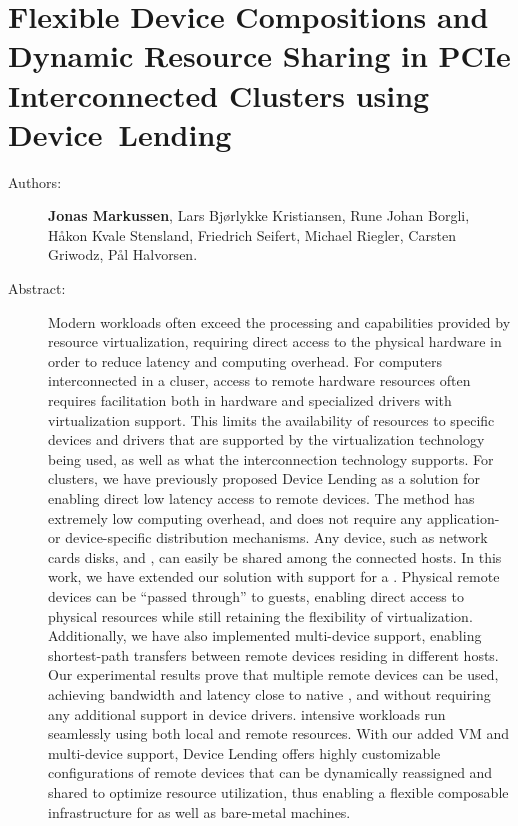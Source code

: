 \chapter{Flexible Device Compositions and Dynamic Resource Sharing in PCIe Interconnected Clusters using Device~Lending}
\label{paper:cc}
\paperthumb

\begin{description}
	\item[Authors:]
		\textbf{Jonas Markussen}, Lars Bj{\o}rlykke Kristiansen, Rune Johan Borgli, H{\aa}kon Kvale Stensland,
		Friedrich Seifert, Michael Riegler, Carsten Griwodz, P{\aa}l Halvorsen.

	\item[Abstract:]
		Modern workloads often exceed the processing and  capabilities provided by resource virtualization,
		requiring direct access to the physical hardware in order to reduce latency and computing overhead.
		For computers interconnected in a cluser, access to remote hardware resources often requires facilitation
		both in hardware and specialized drivers with virtualization support. This limits the availability of
		resources to specific devices and drivers that are supported by the virtualization technology being used, as
		well as what the interconnection technology supports.
		For  clusters, we have previously proposed Device Lending as a solution for enabling direct
		low latency access to remote devices.
		The method has extremely low computing overhead, and does not
		require any application- or device-specific distribution mechanisms. Any  device, such as network cards disks, and
		, can easily be shared among the connected hosts.
		In this work, we have extended our solution with support for a  .
		Physical remote devices can be  ``passed through'' to  guests, enabling direct access to physical resources 
		while still retaining the flexibility of virtualization. Additionally, we have also implemented multi-device
		support, enabling shortest-path  transfers between remote devices residing in different hosts.
		Our experimental results prove that multiple remote devices can be used, achieving bandwidth and latency
		close to native , and without requiring any additional support in device drivers. 
		 intensive workloads run seamlessly using both local and remote resources.
		With our added VM and multi-device support, Device Lending offers highly customizable 
		configurations of remote devices that can be dynamically reassigned and shared to optimize resource 
		utilization, thus enabling a flexible composable  infrastructure for  as well as bare-metal
		machines.


\end{description}

